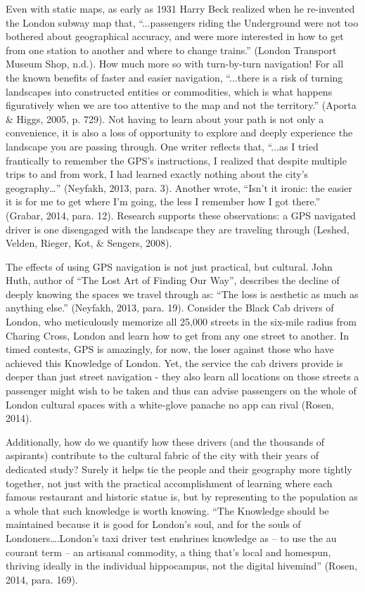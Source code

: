 \documentclass[a4paper]{article}
\begin{document}
Even with static maps, as early as 1931 Harry Beck realized when he re-invented the London subway map that, “...passengers riding the Underground were not too bothered about geographical accuracy, and were more interested in how to get from one station to another and where to change trains.” (London Transport Museum Shop, n.d.). How much more so with turn-by-turn navigation! For all the known benefits of faster and easier navigation, “...there is a risk of turning landscapes into constructed entities or commodities, which is what happens figuratively when we are too attentive to the map and not the territory.”  (Aporta \& Higgs, 2005, p. 729).  Not having to learn about your path is not only a convenience, it is also a loss of opportunity to explore and deeply experience the landscape you are passing through. One writer reflects that, “...as I tried frantically to remember the GPS’s instructions, I realized that despite multiple trips to and from work, I had learned exactly nothing about the city’s geography…” (Neyfakh, 2013, para. 3). Another wrote, “Isn’t it ironic: the easier it is for me to get where I’m going, the less I remember how I got there.” (Grabar, 2014, para. 12).  Research supports these observations: a GPS navigated driver is one disengaged with the landscape they are traveling through (Leshed,  Velden, Rieger, Kot, \& Sengers, 2008). 

The effects of using GPS navigation is not just practical, but cultural. John Huth, author of “The Lost Art of Finding Our Way”, describes the decline of deeply knowing the spaces we travel through as: “The loss is aesthetic as much as anything else.” (Neyfakh, 2013, para. 19). Consider the Black Cab drivers of London, who meticulously memorize all 25,000 streets in the six-mile radius from Charing Cross, London and learn how to get from any one street to another. In timed contests, GPS is amazingly, for now, the loser against those who have achieved this Knowledge of London. Yet, the service the cab drivers provide is deeper than just street navigation - they also learn all locations on those streets a passenger might wish to be taken and thus can advise passengers on the whole of London cultural spaces with a white-glove panache no app can rival (Rosen, 2014).

Additionally, how do we quantify how these drivers (and the thousands of aspirants) contribute to the cultural fabric of the city with their years of dedicated study? Surely it helps tie the people and their geography more tightly together, not just with the practical accomplishment of learning where each famous restaurant and historic statue is, but by representing to the population as a whole that such knowledge is worth knowing. “The Knowledge should be maintained because it is good for London’s soul, and for the souls of Londoners….London’s taxi driver test enshrines knowledge as -- to use the au courant term -- an artisanal commodity, a thing that’s local and homespun, thriving ideally in the individual hippocampus, not the digital hivemind” (Rosen, 2014, para. 169). 
\end{document}
